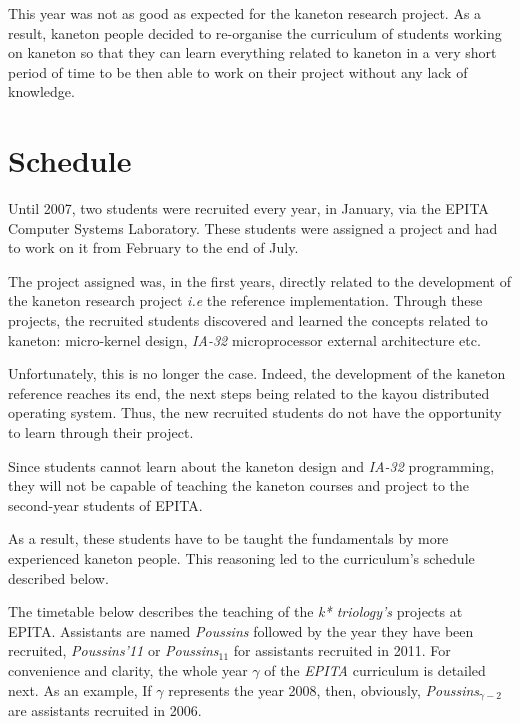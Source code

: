 \begin{multicols}{2}
This year was not as good as expected for the kaneton research project. As a
result, kaneton people decided to re-organise the curriculum of students
working on kaneton so that they can learn everything related to kaneton in a
very short period of time to be then able to work on their project without any
lack of knowledge.

%
%

\section{Schedule}

Until 2007, two students were recruited every year, in January, via the EPITA
Computer Systems Laboratory. These students were assigned a project and had
to work on it from February to the end of July.

The project assigned was, in the first years, directly related to the
development of the kaneton research project \textit{i.e} the reference
implementation. Through these projects, the recruited students discovered
and learned the concepts related to kaneton: micro-kernel design,
\textit{IA-32} microprocessor external architecture etc.

Unfortunately, this is no longer the case. Indeed, the development of the
kaneton reference reaches its end, the next steps being related to the kayou
distributed operating system. Thus, the new recruited students do not have
the opportunity to learn through their project.

Since students cannot learn about the kaneton design and \textit{IA-32}
programming, they will not be capable of teaching the kaneton courses and
project to the second-year students of EPITA.

As a result, these students have to be taught the fundamentals by more
experienced kaneton people. This reasoning led to the curriculum's schedule
described below.

The timetable below describes the teaching of the \textit{k* triology's}
projects at EPITA. Assistants are named \textit{Poussins} followed by the year
they have been recruited, \textit{Poussins'11} or \textit{Poussins$_{11}$} for
assistants recruited in 2011. For convenience and clarity, the whole year
$\gamma$ of the \textit{EPITA} curriculum is detailed next. As an example,
If $\gamma$ represents the year 2008, then, obviously,
\textit{Poussins$_{\gamma - 2}$} are assistants recruited in 2006.


\end{multicols}

